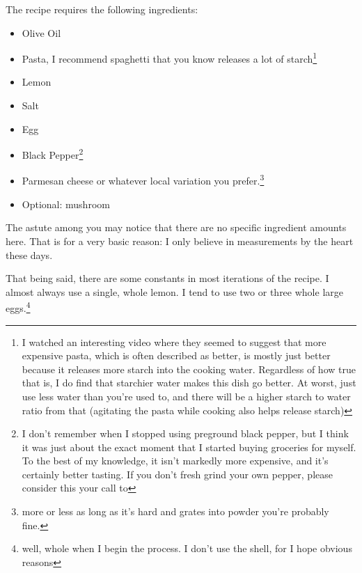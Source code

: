 \documentclass[12pt]{article}[titlepage]
\newcommand{\1}{\={a}}
\newcommand{\2}{\={e}}
\newcommand{\3}{\={\i}}
\newcommand{\4}{\=o}
\newcommand{\5}{\=u}
\newcommand{\6}{\={A}}
\renewcommand{\,}{\textsuperscript{,}}
\begin{document}
The recipe requires the following ingredients:
\begin{itemize}
\item Olive Oil
\item Pasta, I recommend spaghetti that you know releases a lot of starch\footnote{I watched an interesting video where they seemed to suggest that more expensive pasta, which is often described as better, is mostly just better because it releases more starch into the cooking water.
Regardless of how true that is, I do find that starchier water makes this dish go better.
At worst, just use less water than you're used to, and there will be a higher starch to water ratio from that (agitating the pasta while cooking also helps release starch)}
\item Lemon
\item Salt
\item Egg
\item Black Pepper\footnote{I don't remember when I stopped using preground black pepper, but I think it was just about the exact moment that I started buying groceries for myself.
To the best of my knowledge, it isn't markedly more expensive, and it's certainly better tasting.
If you don't fresh grind your own pepper, please consider this your call to}
\item Parmesan cheese or whatever local variation you prefer.\footnote{more or less as long as it's hard and grates into powder you're probably fine.}
\item Optional: mushroom
\end{itemize}

The astute among you may notice that there are no specific ingredient amounts here.
That is for a very basic reason: I only believe in measurements by the heart these days.

That being said, there are some constants in most iterations of the recipe.
I almost always use a single, whole lemon.
I tend to use two or three whole large eggs.\footnote{well, whole when I begin the process.
I don't use the shell, for I hope obvious reasons}
\end{document}
